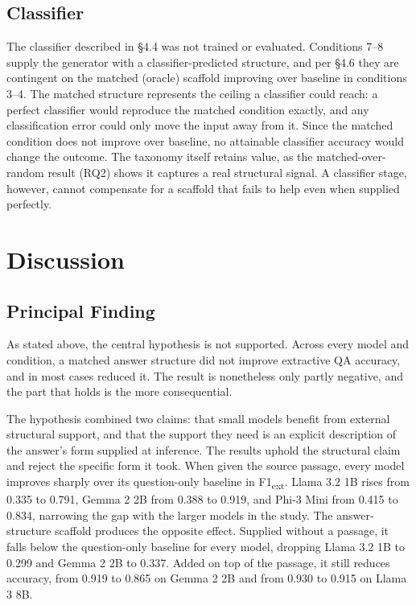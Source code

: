 \documentclass{article}
\begin{document}
\subsection{Classifier}

The classifier described in \S4.4 was not trained or evaluated. Conditions 7--8 supply the generator with a classifier-predicted structure, and per \S4.6 they are contingent on the matched (oracle) scaffold improving over baseline in conditions 3--4. The matched structure represents the ceiling a classifier could reach: a perfect classifier would reproduce the matched condition exactly, and any classification error could only move the input away from it. Since the matched condition does not improve over baseline, no attainable classifier accuracy would change the outcome. The taxonomy itself retains value, as the matched-over-random result (RQ2) shows it captures a real structural signal. A classifier stage, however, cannot compensate for a scaffold that fails to help even when supplied perfectly.

\section{Discussion}

\subsection{Principal Finding}

As stated above, the central hypothesis is not supported. Across every model and condition, a matched answer structure did not improve extractive QA accuracy, and in most cases reduced it. The result is nonetheless only partly negative, and the part that holds is the more consequential.

The hypothesis combined two claims: that small models benefit from external structural support, and that the support they need is an explicit description of the answer's form supplied at inference. The results uphold the structural claim and reject the specific form it took. When given the source passage, every model improves sharply over its question-only baseline in F1\textsubscript{ext}. Llama 3.2 1B rises from 0.335 to 0.791, Gemma 2 2B from 0.388 to 0.919, and Phi-3 Mini from 0.415 to 0.834, narrowing the gap with the larger models in the study. The answer-structure scaffold produces the opposite effect. Supplied without a passage, it falls below the question-only baseline for every model, dropping Llama 3.2 1B to 0.299 and Gemma 2 2B to 0.337. Added on top of the passage, it still reduces accuracy, from 0.919 to 0.865 on Gemma 2 2B and from 0.930 to 0.915 on Llama 3 8B.
\end{document}
